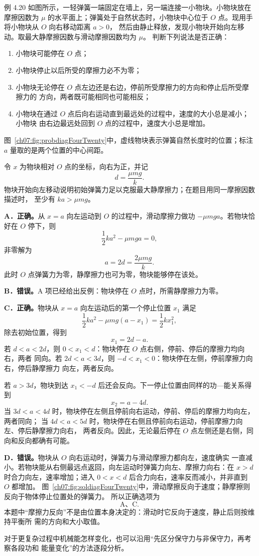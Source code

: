 \Needspace{0.38\textheight}
\begin{origexamplebox}{例 4.20}
如图所示，一轻弹簧一端固定在墙上，另一端连接一小物块。小物块放在摩擦因数为 $\mu$
的水平面上；弹簧处于自然状态时，小物块中心位于 $O$ 点。现用手将小物块从 $O$ 向右移动距离 $a>0$，
然后由静止释放，发现小物块开始向左移动。取最大静摩擦因数与滑动摩擦因数均为 $\mu$。
判断下列说法是否正确：
\begin{enumerate}[label=\Alph*.,leftmargin=2.2em]
 \item 小物块可能停在 $O$ 点；
 \item 小物块停止以后所受的摩擦力必不为零；
 \item 小物块无论停在 $O$ 点左边还是右边，停前所受摩擦力的方向和停止后所受摩擦力的
 方向，两者既可能相同也可能相反；
 \item 小物块在通过 $O$ 点后向右运动直到最远处的过程中，速度的大小总是减小；小物块
 由右边最远处回到 $O$ 点的过程中，速度大小总是增加。
\end{enumerate}
图~\ref{ch07:fig:probdiagFourTwenty}中，虚线物块表示弹簧自然长度时的位置；标注 $a$ 量取的是两个位置的中心间距。
\probdiagFourTwenty
\end{origexamplebox}

\begin{xesolution}
令 $x$ 为物块相对 $O$ 点的坐标，向右为正，并记
\[
 d=\frac{\mu mg}{k}.
\]
物块开始向左移动说明初始弹簧力足以克服最大静摩擦力；在题目用同一摩擦因数描述时，
至少有 $ka>\mu mg$。

\textbf{A．正确。}\quad 从 $x=a$ 向左运动到 $O$ 的过程中，滑动摩擦力做功
$-\mu mga$。若物块恰好在 $O$ 停下，则
\[
 \frac12ka^2-\mu mga=0,
\]
非零解为
\[
 a=2d=\frac{2\mu mg}{k}.
\]
此时 $O$ 点弹簧力为零，静摩擦力也可为零，物块能够停在该处。

\textbf{B．错误。}\quad A 项已经给出反例：物块停在 $O$ 点时，所需静摩擦力为零。

\textbf{C．正确。}\quad 物块从 $x=a$ 向左运动后的第一个停止位置 $x_1$ 满足
\[
 \frac12ka^2-\mu mg(a-x_1)=\frac12kx_1^2,
\]
除去初始位置，得到
\[
 x_1=2d-a.
\]
若 $d<a<2d$，则 $0<x_1<d$：物块停在 $O$ 点右侧，停前、停后的摩擦力均向右，两者
同向。若 $2d<a<3d$，则 $-d<x_1<0$：物块停在左侧，停前摩擦力向右，停后静摩擦力
向左，两者反向。

若 $a>3d$，物块到达 $x_1<-d$ 后还会反向。下一停止位置由同样的功—能关系得到
\[
 x_2=a-4d.
\]
当 $3d<a<4d$ 时，物块停在左侧且停前向右运动，停前、停后的摩擦力均向左，两者同向；
当 $4d<a<5d$ 时，物块停在右侧且停前向右运动，停前摩擦力向左、停后静摩擦力向右，
两者反向。因此，无论最后停在 $O$ 点左侧还是右侧，同向和反向都确有可能。

\textbf{D．错误。}\quad 物块从 $O$ 向右运动时，弹簧力与滑动摩擦力都向左，速度确实
一直减小。若物块能从右侧最远点返回，向左运动时弹簧力向左、摩擦力向右：在 $x>d$
时合力向左，速率增加；进入 $0<x<d$ 后合力向右，速率反而减小，并非直到 $O$ 都增加。
图~\ref{ch07:fig:soldiagFourTwenty}中，滑动摩擦反向于速度；静摩擦则反向于物体停止位置处的弹簧力。
\soldiagFourTwenty
所以正确选项为
\[
 \boxed{\text{A、C}}.
\]
本题中“摩擦力反向”不是由位置本身决定的：滑动时它反向于速度，静止后则按维持平衡所
需的方向和大小取值。
\end{xesolution}

对于更复杂过程中机械能怎样变化，也可以沿用“先区分保守力与非保守力，再考察各段功和
能量变化”的方法逐段分析。



